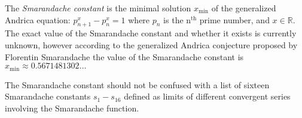 \documentclass[12pt]{article}
\begin{document}
The \emph{Smarandache constant} is the minimal solution $x_{\min}$ of the generalized Andrica equation:
$p_{n+1}^{x}-p_{n}^{x}=1$
where $p_n$ is the n$^{\text{th}}$ prime number, and $x \in \mathbb{R}$. The exact value of the Smarandache constant and whether it exists is currently unknown, however according to the generalized Andrica conjecture proposed by Florentin Smarandache the value of the Smarandache constant is $x_{\min}\approx0.5671481302\ldots$

The Smarandache constant should not be confused with a list of sixteen Smarandache constants $s_{1}-s_{16}$ defined as limits of different convergent series involving the Smarandache function.
\end{document}
